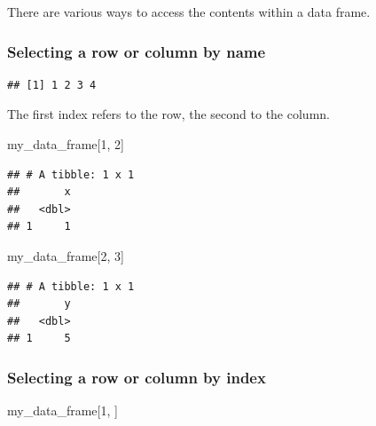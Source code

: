 \documentclass[12pt,]{book}
\newenvironment{Shaded}{\begin{snugshade}}{\end{snugshade}}
\newcommand{\DecValTok}[1]{\textcolor[rgb]{0.00,0.00,0.81}{#1}}
\newcommand{\NormalTok}[1]{#1}
\newcommand{\OperatorTok}[1]{\textcolor[rgb]{0.81,0.36,0.00}{\textbf{#1}}}
\begin{document}
There are various ways to access the contents within a data frame.

\hypertarget{selecting-a-row-or-column-by-name}{%
\subsubsection{Selecting a row or column by name}\label{selecting-a-row-or-column-by-name}}

\begin{Shaded}
\end{Shaded}

\begin{verbatim}
## [1] 1 2 3 4
\end{verbatim}

The first index refers to the row, the second to the column.

\begin{Shaded}
\begin{Highlighting}[]
\NormalTok{my_data_frame[}\DecValTok{1}\NormalTok{, }\DecValTok{2}\NormalTok{]}
\end{Highlighting}
\end{Shaded}

\begin{verbatim}
## # A tibble: 1 x 1
##       x
##   <dbl>
## 1     1
\end{verbatim}

\begin{Shaded}
\begin{Highlighting}[]
\NormalTok{my_data_frame[}\DecValTok{2}\NormalTok{, }\DecValTok{3}\NormalTok{]}
\end{Highlighting}
\end{Shaded}

\begin{verbatim}
## # A tibble: 1 x 1
##       y
##   <dbl>
## 1     5
\end{verbatim}

\hypertarget{selecting-a-row-or-column-by-index}{%
\subsubsection{Selecting a row or column by index}\label{selecting-a-row-or-column-by-index}}

\begin{Shaded}
\begin{Highlighting}[]
\NormalTok{my_data_frame[}\DecValTok{1}\NormalTok{, ]}
\end{Highlighting}
\end{Shaded}
\end{document}
